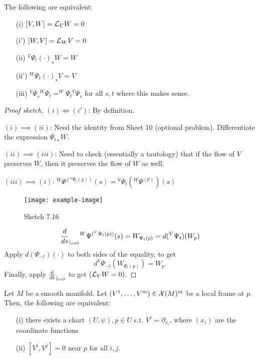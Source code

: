 \begin{theorem}\label{thm:7.15}
    The following are equivalent:
    \begin{enumerate}
        \item[(i)] \([V,W]=\mathcal{L}_VW=0\) 
        \item[(i')] \([W,V]=\mathcal{L}_WV=0\)
        \item[(ii)] \(^V\Psi_t(\cdot)_\star W=W\)
        \item[(ii')] \(^W\Psi_t(\cdot)_\star V=V\)
        \item[(iii)] \(^V\Psi_s {}^W\Psi_t=^W\Psi_t {}^V\Psi_s\) for all \(s,t\) where this makes sense.   
    \end{enumerate}
\end{theorem}

\begin{proof}[Proof sketch]
    \((i)\iff (i')\): By definition.

    \((i)\implies (ii)\): Need the identity from Sheet 10 (optional problem). Differentiate the expression \(\Psi_{t\star}W\).

    \((ii)\implies (iii)\): Need to check (essentially a tautology) that if the flow of \(V\) preserves \(W\), then it preserves the flow of \(W\) as well.

    \((iii)\implies (i)\): \(^W\Psi {}^{( {}^V\Psi_t(p))}(s)= {}^V\Psi_t({}^W\Psi^{(p)})(s)\)
    \begin{figure}[H]\label{fig:7.16}
        \centering
        \texttt{[image: example-image]}
        \caption{Sketch 7.16}
    \end{figure}
    \[\frac{d}{ds}_{|_{s=0}} {}^W\Psi {}^{( {}^V\Psi_t(p))}(s)=W_{\Psi_t(p)}=d( {}^V\Psi_t)(W_p)\]
    Apply \(d(\Psi_{-t})(\cdot)\) to both sides of the equality, to get 
    \[d ^V\Psi_{-t}\left(W_{\Psi_t(p)}\right)=W_p.\]
    Finally, apply \(\frac{d}{dt}_{|_{t=0}}\) to get \((\mathcal{L}_VW=0)\).
\end{proof}


\begin{theorem}\label{thm:7.16}
    Let \(M\) be a smooth manifold. Let \((V^1,\dots,V^m)\in \mathcal{X}(M)^m\) be a local frame at \(p\).
    Then, the following are equivalent:
    \begin{enumerate}
        \item[(i)] there exists a chart \((U,\psi),p\in U\) s.t. \(V^i=\partial_{x_i}\), where \((x_i)\) are the coordinate functions
        \item[(ii)] \([V^i,V^j]=0\) near \(p\) for all \(i,j\).  
    \end{enumerate}
\end{theorem}


